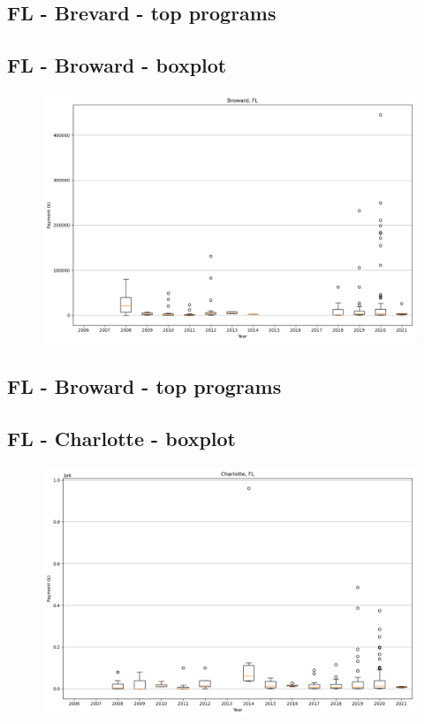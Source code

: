 \subsection*{FL - Brevard - top programs}

\newpage
\subsection*{FL - Broward - boxplot}
\begin{figure}[h]
\centering
\includegraphics[width=7in]{../output/boxplots/counties/Broward-FL_boxplot.png}
\end{figure}


\subsection*{FL - Broward - top programs}

\newpage
\subsection*{FL - Charlotte - boxplot}
\begin{figure}[h]
\centering
\includegraphics[width=7in]{../output/boxplots/counties/Charlotte-FL_boxplot.png}
\end{figure}


